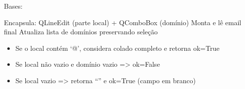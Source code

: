 \documentclass[letterpaper,10pt,english]{sphinxmanual}
\begin{document}
\begin{fulllineitems}
\label{\detokenize{api/widgets:widgets.EmailInputWidget}}
\pysigstartsignatures
\pysiglinewithargsret
{}
{\sphinxparamcomma {}}
{}
\pysigstopsignatures
\sphinxAtStartPar
Bases: 

\sphinxAtStartPar
Encapsula:
\sphinxhyphen{} QLineEdit (parte local) + QComboBox (domínio)
\sphinxhyphen{} Monta e lê email final
\sphinxhyphen{} Atualiza lista de domínios preservando seleção
\begin{itemize}
\item {} 
\sphinxAtStartPar
Se o local contém ‘@’, considera colado completo e retorna ok=True

\item {} 
\sphinxAtStartPar
Se local não vazio e domínio vazio =\textgreater{} ok=False

\item {} 
\sphinxAtStartPar
Se local vazio =\textgreater{} retorna “” e ok=True (campo em branco)

\end{itemize}

\begin{fulllineitems}
\label{\detokenize{api/widgets:widgets.EmailInputWidget.set_domains}}
\pysigstartsignatures
\pysiglinewithargsret
{}
{}
{}
\pysigstopsignatures\begin{quote}\begin{description}
\sphinxAtStartPar
{}

\end{description}\end{quote}

\end{fulllineitems}


\begin{fulllineitems}
\label{\detokenize{api/widgets:widgets.EmailInputWidget.local}}
\pysigstartsignatures
\pysiglinewithargsret
{}
{}
{}
\pysigstopsignatures\begin{quote}\begin{description}
\sphinxAtStartPar
{}


\end{description}
\end{quote}
\end{fulllineitems}
\end{fulllineitems}
\end{document}
